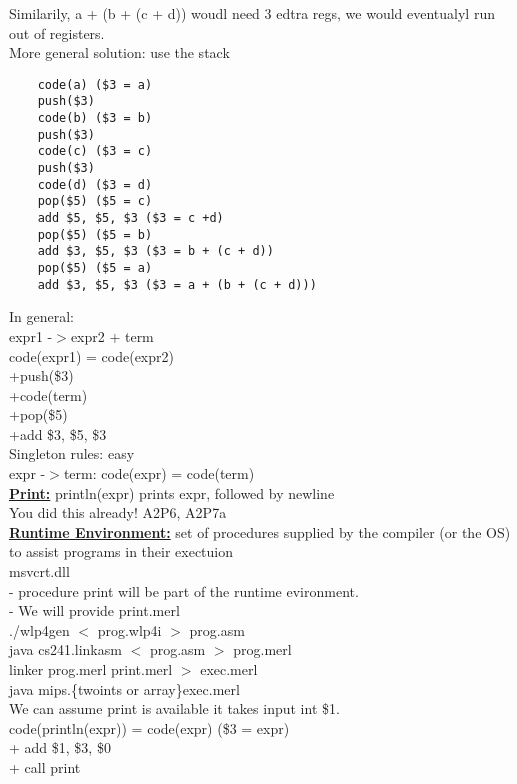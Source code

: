 \documentclass[12pt]{article}
\newcommand{\myt}[1]{\textbf{\underline{#1}}}
\begin{document}
	Similarily, a + (b + (c + d)) woudl need 3 edtra regs, we would eventualyl run out of registers.\\
	More general solution: use the stack\\
	\begin{verbatim}
	code(a) ($3 = a)
	push($3)
	code(b) ($3 = b)
	push($3)
	code(c) ($3 = c)
	push($3)
	code(d) ($3 = d)
	pop($5) ($5 = c)
	add $5, $5, $3 ($3 = c +d)
	pop($5) ($5 = b)
	add $3, $5, $3 ($3 = b + (c + d))
	pop($5) ($5 = a)
	add $3, $5, $3 ($3 = a + (b + (c + d)))
	\end{verbatim}
	
	In general:\\
	expr1 -$>$expr2 + term\\
	code(expr1) = code(expr2)\\
	+push(\$3)\\
	+code(term)\\
	+pop(\$5)\\
	+add \$3, \$5, \$3\\
	
	Singleton rules: easy\\
	expr -$>$term: code(expr) = code(term)\\
	
	\myt{Print:} println(expr) prints expr, followed by newline\\
	You did this already! A2P6, A2P7a\\
	
	\myt{Runtime Environment:} set of procedures supplied by the compiler (or the OS) to assist programs in their exectuion\\
	msvcrt.dll\\
	- procedure print will be part of the runtime evironment.\\
	- We will provide print.merl\\
	
	./wlp4gen $<$ prog.wlp4i $>$ prog.asm\\
	java cs241.linkasm $<$ prog.asm $>$ prog.merl\\
	linker prog.merl print.merl $>$ exec.merl\\
	java mips.\{twoints or array\}exec.merl\\
	
	We can assume print is available it takes input int \$1.\\
	
	code(println(expr)) = code(expr) (\$3 = expr)\\
	+ add \$1, \$3, \$0\\
	+ call print\\
	
\end{document}
